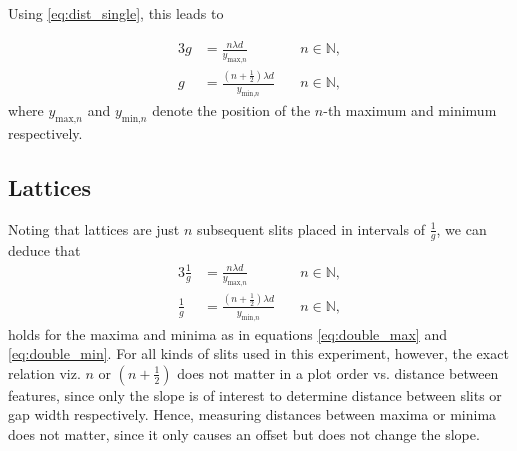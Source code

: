 Using \autoref{eq:dist_single}, this leads to

\begin{alignat}{3}
 	g &= \frac{n\lambda d}{y_{\text{max,}n}} &\quad n\in\mathbb{N},\label{eq:double_max} \\
	g &= \frac{\left(n+\frac{1}{2}\right)\lambda d}{y_{\text{min,}n}} &\quad n\in\mathbb{N}, \label{eq:double_min}
\end{alignat}
where $y_{\text{max,}n}$ and $y_{\text{min,}n}$ denote the position of the $n$-th maximum and minimum respectively.

\subsection{Lattices}\label{subsec:lattices}
Noting that lattices are just $n$ subsequent slits placed in intervals of $\frac{1}{g}$, we can deduce that
\begin{alignat}{3}
 	\frac{1}{g} &= \frac{n\lambda d}{y_{\text{max,}n}} &\quad n\in\mathbb{N},\label{eq:lattice_max} \\
	\frac{1}{g} &= \frac{\left(n+\frac{1}{2}\right)\lambda d}{y_{\text{min,}n}} &\quad n\in\mathbb{N}, \label{eq:lattice_min}
\end{alignat}
holds for the maxima and minima as in equations \ref{eq:double_max} and \ref{eq:double_min}.
For all kinds of slits used in this experiment, however, the exact relation viz. $n$ or $\left(n+\frac{1}{2}\right)$ does not matter in a plot order vs. distance between features, since only the slope is of interest to determine distance between slits or gap width respectively.
Hence, measuring distances between maxima or minima does not matter, since it only causes an offset but does not change the slope.

